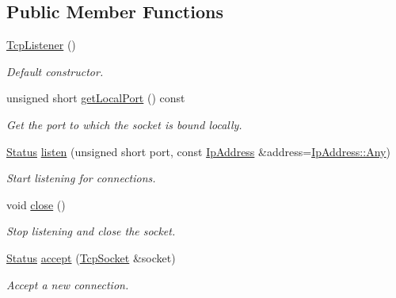 \subsection*{Public Member Functions}
\begin{DoxyCompactItemize}
\item 
\mbox{\label{classsf_1_1_tcp_listener_a59a1db5b6f4711a3e57390da2f8d9630}} 
\hyperlink{classsf_1_1_tcp_listener_a59a1db5b6f4711a3e57390da2f8d9630}{Tcp\+Listener} ()
\begin{DoxyCompactList}\small\item\em Default constructor. \end{DoxyCompactList}\item 
unsigned short \hyperlink{classsf_1_1_tcp_listener_a784b9a9c59d4cdbae1795e90b8015780}{get\+Local\+Port} () const
\begin{DoxyCompactList}\small\item\em Get the port to which the socket is bound locally. \end{DoxyCompactList}\item 
\hyperlink{classsf_1_1_socket_a51bf0fd51057b98a10fbb866246176dc}{Status} \hyperlink{classsf_1_1_tcp_listener_a9504758ea3570e62cb20b209c11776a1}{listen} (unsigned short port, const \hyperlink{classsf_1_1_ip_address}{Ip\+Address} \&address=\hyperlink{classsf_1_1_ip_address_a3dbc10b0dc6804cc69e29342f7406907}{Ip\+Address\+::\+Any})
\begin{DoxyCompactList}\small\item\em Start listening for connections. \end{DoxyCompactList}\item 
void \hyperlink{classsf_1_1_tcp_listener_a3a00a850506bd0f9f48867a0fe59556b}{close} ()
\begin{DoxyCompactList}\small\item\em Stop listening and close the socket. \end{DoxyCompactList}\item 
\hyperlink{classsf_1_1_socket_a51bf0fd51057b98a10fbb866246176dc}{Status} \hyperlink{classsf_1_1_tcp_listener_ae2c83ce5a64d50b68180c46bef0a7346}{accept} (\hyperlink{classsf_1_1_tcp_socket}{Tcp\+Socket} \&socket)
\begin{DoxyCompactList}\small\item\em Accept a new connection. \end{DoxyCompactList}\end{DoxyCompactItemize}
